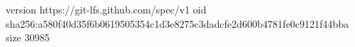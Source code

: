 version https://git-lfs.github.com/spec/v1
oid sha256:a580f40d35f6b0619505354c1d3e8275c3dadcfe2d600b4781fe0c9121f44bba
size 30985
